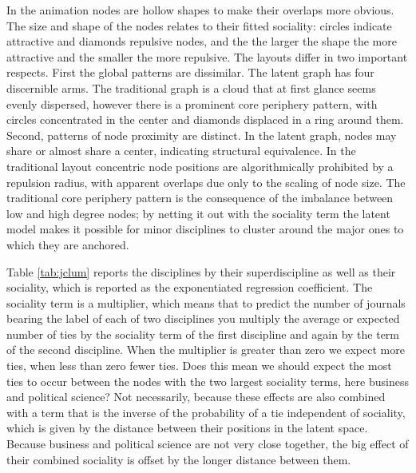 \documentclass[]{book}
\theoremstyle{definition}
\theoremstyle{definition}
\theoremstyle{definition}
\theoremstyle{remark}
\begin{document}
In the animation nodes are hollow shapes to make their overlaps more
obvious. The size and shape of the nodes relates to their fitted
sociality: circles indicate attractive and diamonds repulsive nodes, and
the the larger the shape the more attractive and the smaller the more
repulsive. The layouts differ in two important respects. First the
global patterns are dissimilar. The latent graph has four discernible
arms. The traditional graph is a cloud that at first glance seems evenly
dispersed, however there is a prominent core periphery pattern, with
circles concentrated in the center and diamonds displaced in a ring
around them. Second, patterns of node proximity are distinct. In the
latent graph, nodes may share or almost share a center, indicating
structural equivalence. In the traditional layout concentric node
positions are algorithmically prohibited by a repulsion radius, with
apparent overlaps due only to the scaling of node size. The traditional
core periphery pattern is the consequence of the imbalance between low
and high degree nodes; by netting it out with the sociality term the
latent model makes it possible for minor disciplines to cluster around
the major ones to which they are anchored.

Table \ref{tab:jclum} reports the disciplines by their superdiscipline
as well as their sociality, which is reported as the exponentiated
regression coefficient. The sociality term is a multiplier, which means
that to predict the number of journals bearing the label of each of two
disciplines you multiply the average or expected number of ties by the
sociality term of the first discipline and again by the term of the
second discipline. When the multiplier is greater than zero we expect
more ties, when less than zero fewer ties. Does this mean we should
expect the most ties to occur between the nodes with the two largest
sociality terms, here business and political science? Not necessarily,
because these effects are also combined with a term that is the inverse
of the probability of a tie independent of sociality, which is given by
the distance between their positions in the latent space. Because
business and political science are not very close together, the big
effect of their combined sociality is offset by the longer distance
between them.
\end{document}
